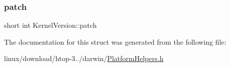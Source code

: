 \subsubsection{\texorpdfstring{patch}{patch}}
{\footnotesize\ttfamily short int Kernel\+Version\+::patch}



The documentation for this struct was generated from the following file\+:\begin{DoxyCompactItemize}
\item 
linux/download/htop-\/3../darwin/\hyperlink{PlatformHelpers_8h}{Platform\+Helpers.\+h}\end{DoxyCompactItemize}
